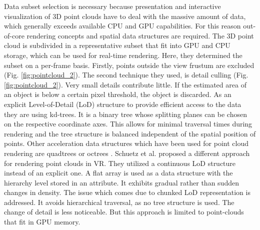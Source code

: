 \documentclass[10pt,twocolumn,letterpaper]{article}
\begin{document}
\setlength{\parindent}{1pc}Data subset selection is necessary because presentation and interactive visualization of 3D point clouds have to deal with the massive amount of data, which generally exceeds available CPU and GPU capabilities. For this reason out-of-core rendering concepts and spatial data structures are required. The 3D point cloud is subdivided in a representative subset that fit into GPU and CPU storage, which can be used for real-time rendering. Here, they determined the subset on a per-frame basis. Firstly, points outside the view frustum are excluded (Fig. \ref{fig:pointcloud_2}). The second technique they used, is detail culling (Fig. \ref{fig:pointcloud_2}). Very small details contribute little. If the estimated area of an object is below a certain pixel threshold, the object is discarded. As an explicit Level-of-Detail (LoD) structure to provide efficient access to the data they are using kd-trees. It is a binary tree whose splitting planes can be chosen on the respective coordinate axes. This allows for minimal traversal times during rendering and the tree structure is balanced independent of the spatial position of points. Other acceleration data structures which have been used for point cloud rendering are quadtrees \cite{Gao:2014:VAL:2619648.2619672} or octrees \cite{kreylos2008immersive}. Schuetz et al. \cite{schuetz-2019-CLOD} proposed a different approach for rendering point clouds in VR. They utilized a continuous LoD structure instead of an explicit one. A flat array is used as a data structure with the hierarchy level stored in an attribute. It exhibits gradual rather than sudden changes in density. The issue which comes due to chunked LoD representation is addressed. It avoids hierarchical traversal, as no tree structure is used. The change of detail is less noticeable. But this approach is limited to point-clouds that fit in GPU memory.
\end{document}
